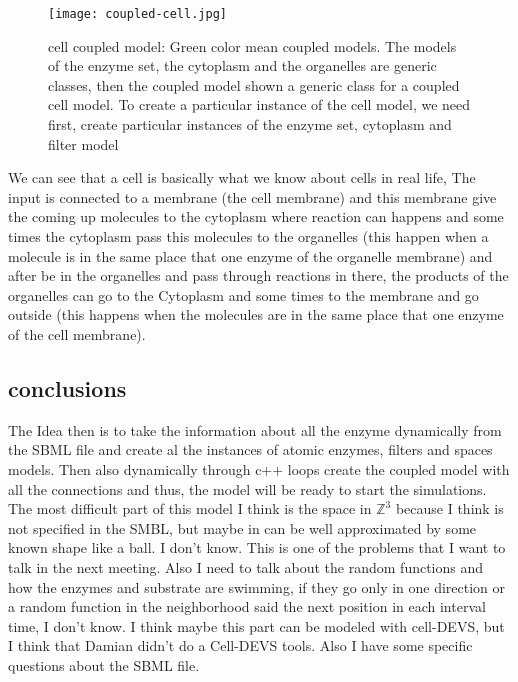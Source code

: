 \documentclass[12pt]{article}
\begin{document}
\begin{figure}[h!]
 \centering
  \texttt{[image: coupled-cell.jpg]}
 \caption{cell coupled model: Green color mean coupled models. The models of the enzyme set, the cytoplasm and the organelles are generic classes, then the coupled model shown a generic class for a coupled cell model. To create a particular instance of the cell model, we need first, create particular instances of the enzyme set, cytoplasm and filter model}
\end{figure}

We can see that a cell is basically what we know about cells in real life, The input is connected to a membrane (the cell membrane) and this membrane give the coming up molecules to the cytoplasm where reaction can happens and some times the cytoplasm pass this molecules to the organelles (this happen when a molecule is in the same place that one enzyme of the organelle membrane) and after be in the organelles and pass through reactions in there, the products of the organelles can go to the Cytoplasm and some times to the membrane and go outside (this happens when the molecules are in the same place that one enzyme of the cell membrane).

\subsection*{conclusions}

The Idea then is to take the information about all the enzyme dynamically from the SBML file and create al the instances of atomic enzymes, filters and spaces models. Then also dynamically through c++ loops create the coupled model with all the connections and thus, the model will be ready to start the simulations.
The most difficult part of this model I think is the space in $\mathbb{Z}^3$ because I think is not specified in the SMBL, but maybe in can be well approximated by some known shape like a ball. I don't know. This is one of the problems that I want to talk in the next meeting. Also I need to talk about the random functions and how the enzymes and substrate are swimming, if they go only in one direction or a random function in the neighborhood said the next position in each interval time, I don't know. I think maybe this part can be modeled with cell-DEVS, but I think that Damian didn't do a Cell-DEVS tools.
Also I have some specific questions about the SBML file.
\end{document}
